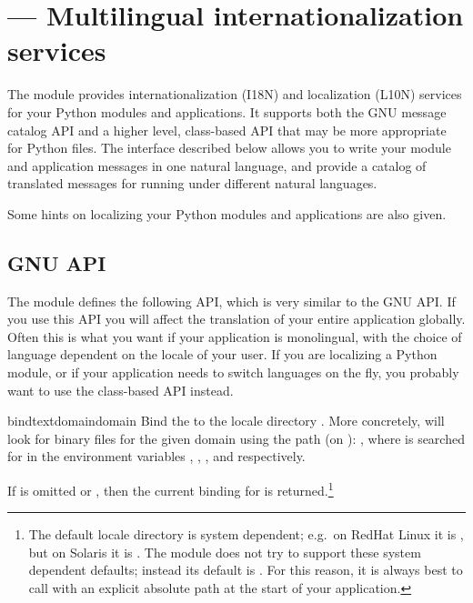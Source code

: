 \section{ ---
         Multilingual internationalization services}



The  module provides internationalization (I18N) and
localization (L10N) services for your Python modules and applications.
It supports both the GNU  message catalog API and a
higher level, class-based API that may be more appropriate for Python
files.  The interface described below allows you to write your
module and application messages in one natural language, and provide a
catalog of translated messages for running under different natural
languages.

Some hints on localizing your Python modules and applications are also
given.

\subsection{GNU  API}

The  module defines the following API, which is very
similar to the GNU  API.  If you use this API you
will affect the translation of your entire application globally.  Often
this is what you want if your application is monolingual, with the choice
of language dependent on the locale of your user.  If you are
localizing a Python module, or if your application needs to switch
languages on the fly, you probably want to use the class-based API
instead.

\begin{funcdesc}{bindtextdomain}{domain}
Bind the  to the locale directory
.  More concretely,  will look for
binary  files for the given domain using the path (on \UNIX):
,
where  is searched for in the environment variables
, , , and
 respectively.

If  is omitted or , then the current binding
for  is returned.\footnote{
        The default locale directory is system dependent; e.g.\ on
        RedHat Linux it is , but on Solaris it
        is .  The  module does
        not try to support these system dependent defaults; instead
        its default is .  For
        this reason, it is always best to call
         with an explicit absolute path at
        the start of your application.}
\end{funcdesc}

